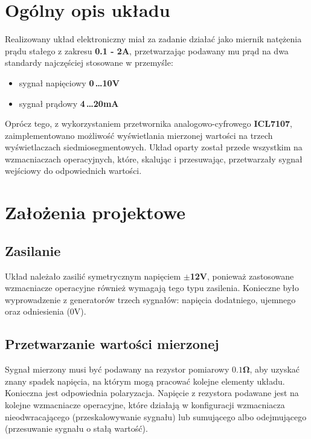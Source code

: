 \documentclass[12pt]{article}
\begin{document}
\newpage

\tableofcontents
\listoffigures
\listoftables

\newpage

\section{Ogólny opis układu}
Realizowany układ elektroniczny miał za zadanie działać jako miernik natężenia prądu stałego z zakresu \textbf{0.1 - 2A}, przetwarzając podawany mu prąd na dwa standardy najczęściej stosowane w przemyśle:
\begin{itemize}
	\item sygnał napięciowy \textbf{0\,\dots10V}
	\item sygnał prądowy \textbf{4\,\dots20mA}
\end{itemize}
Oprócz tego, z wykorzystaniem przetwornika analogowo-cyfrowego \textbf{ICL7107}, zaimplementowano możliwość wyświetlania mierzonej wartości na trzech wyświetlaczach siedmiosegmentowych. Układ oparty został przede wszystkim na wzmacniaczach operacyjnych, które, skalując i przesuwając, przetwarzały sygnał wejściowy do odpowiednich wartości. \\

\section{Założenia projektowe}
\subsection{Zasilanie}
Układ należało zasilić symetrycznym napięciem $\pm$\textbf{12V}, ponieważ zastosowane wzmacniacze operacyjne również wymagają tego typu zasilenia. Konieczne było wyprowadzenie z generatorów trzech sygnałów: napięcia dodatniego, ujemnego oraz odniesienia (0V). 
\subsection{Przetwarzanie wartości mierzonej}
Sygnał mierzony musi być podawany na rezystor pomiarowy $\mathbf{0.1\Omega}$, aby uzyskać znany spadek napięcia, na którym mogą pracować kolejne elementy układu. Konieczna jest odpowiednia polaryzacja. Napięcie z rezystora podawane jest na kolejne wzmacniacze operacyjne, które działają w konfiguracji wzmacniacza nieodwracającego (przeskalowywanie sygnału) lub sumującego albo odejmującego (przesuwanie sygnału o stałą wartość). 
\end{document}
